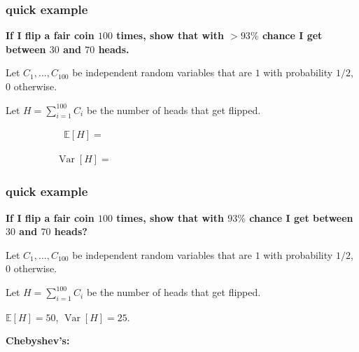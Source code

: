 \documentclass[handout,compress]{beamer}
\newcommand{\E}{\mathbb{E}}
\DeclareMathOperator{\Var}{Var}
\begin{document}
\begin{frame}
	\frametitle{quick example}
	\begin{center}
	\textbf{If I flip a fair coin $100$ times, show that with $> 93\%$ chance I get between $30$ and $70$ heads.}
	\end{center}
	Let $C_1, \ldots, C_{100}$ be independent random variables that are $1$ with probability $1/2$, $0$ otherwise.

	Let $H = \sum_{i=1}^{100} C_i$ be the number of heads that get flipped.	
	
	\begin{align*}
		\E[H] = \hspace{20em}
	\end{align*}

	\begin{align*}
	\Var[H] = \hspace{20em}
	\end{align*}
\vspace{4em}
\end{frame}



\begin{frame}
	\frametitle{quick example}
	\begin{center}
		\textbf{If I flip a fair coin $100$ times, show that with $93\%$ chance I get between $30$ and $70$ heads?}
	\end{center}
	Let $C_1, \ldots, C_{100}$ be independent random variables that are $1$ with probability $1/2$, $0$ otherwise.
	
	Let $H = \sum_{i=1}^{100} C_i$ be the number of heads that get flipped.	
	
	$\E[H] = 50$,  $\Var[H] = 25$.  
	
	\textbf{Chebyshev's:}

	\vspace{4em}
\end{frame}
\end{document}
